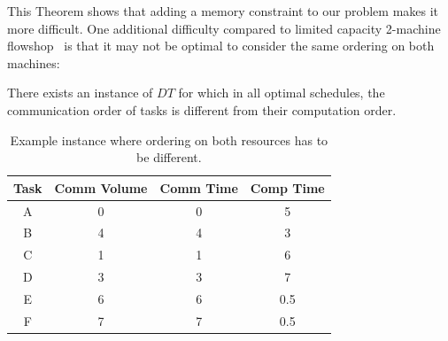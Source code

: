 \documentclass[sigconf]{acmart}
\begin{document}
	
	
	This Theorem shows that adding a memory constraint to our
	problem makes it more difficult. One additional difficulty
	compared to limited capacity 2-machine
	flowshop~\cite{Papadimitriou:1980:FSL:322203.322213} is that
	it may not be optimal to consider the same ordering on both
	machines:
	
	\begin{proposition}
		There exists an instance of $DT$ for which in all optimal
		schedules, the communication order of tasks is different
		from their computation order.
	\end{proposition}
	
	\begin{table}
		\begin{center}
			\begin{tabular}{|c|c|c|c|}
				\hline
				Task & Comm Volume & Comm Time & Comp Time\\ \hline 
				A & 0 & 0 & 5\\ \hline
				B & 4 & 4 & 3\\ \hline
				C & 1 & 1 & 6\\ \hline
				D & 3 & 3 & 7\\ \hline
				E & 6 & 6 & 0.5\\ \hline
				F & 7 & 7 & 0.5\\ \hline
			\end{tabular}
		\end{center}
		\caption{Example instance where ordering on both resources
			has to be different.}
		\label{table:different.order}
	\end{table}
	
\end{document}
